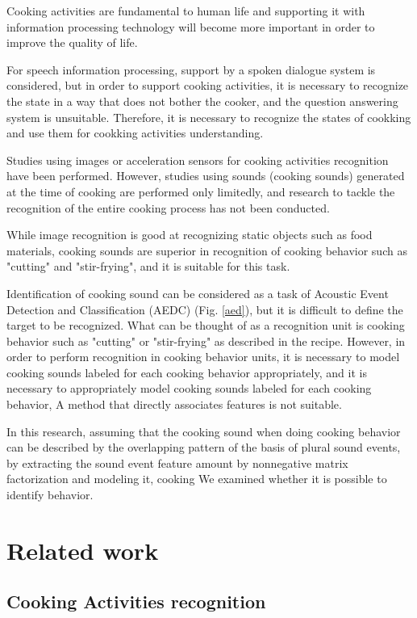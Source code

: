 \documentclass[sigchi]{acmart}
\begin{document}
Cooking activities are fundamental to human life and supporting it with information processing technology will become more important in order to improve the quality of life\cite{Uriu2012}.

For speech information processing, support by a spoken dialogue system is considered, but in order to support cooking activities, it is necessary to recognize the state in a way that does not bother the cooker, and the question answering system is unsuitable. Therefore, it is necessary to recognize the states of cookking and use them for cookking activities understanding.

Studies using images or acceleration sensors for cooking activities recognition have been performed\cite{Torre2008}\cite{Shimada2013}\cite{Kuehne2014}.
However, studies using sounds (cooking sounds) generated at the time of cooking are performed only limitedly\cite{Kojima2016}, and research to tackle the recognition of the entire cooking process has not been conducted.

While image recognition is good at recognizing static objects such as food materials, cooking sounds are superior in recognition of cooking behavior such as "cutting" and "stir-frying", and it is suitable for this task.

Identification of cooking sound can be considered as a task of Acoustic Event Detection and Classification (AEDC) (Fig. \ref{aed}), but it is difficult to define the target to be recognized.
What can be thought of as a recognition unit is cooking behavior such as "cutting" or "stir-frying" as described in the recipe. However, in order to perform recognition in cooking behavior units, it is necessary to model cooking sounds labeled for each cooking behavior appropriately, and it is necessary to appropriately model cooking sounds labeled for each cooking behavior, A method that directly associates features is not suitable\cite{Maijala2018}.

In this research, assuming that the cooking sound when doing cooking behavior can be described by the overlapping pattern of the basis of plural sound events, by extracting the sound event feature amount by nonnegative matrix factorization and modeling it, cooking We examined whether it is possible to identify behavior.

\section{Related work}
\subsection{Cooking Activities recognition}
\end{document}
